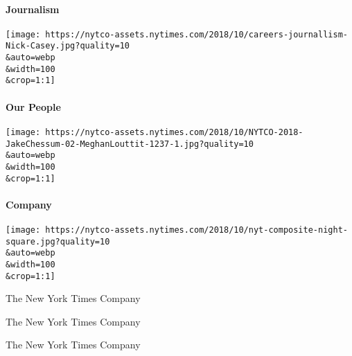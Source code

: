 \href{https://www.nytco.com/journalism/}{}

\hypertarget{journalism}{%
\paragraph{Journalism}\label{journalism}}

\texttt{[image: https://nytco-assets.nytimes.com/2018/10/careers-journallism-Nick-Casey.jpg?quality=10\\\&auto=webp\\\&width=100\\\&crop=1:1]}

\href{https://www.nytco.com/company/people/}{}

\hypertarget{our-people}{%
\paragraph{Our People}\label{our-people}}

\texttt{[image: https://nytco-assets.nytimes.com/2018/10/NYTCO-2018-JakeChessum-02-MeghanLouttit-1237-1.jpg?quality=10\\\&auto=webp\\\&width=100\\\&crop=1:1]}

\href{https://www.nytco.com/company/}{}

\hypertarget{company}{%
\paragraph{Company}\label{company}}

\texttt{[image: https://nytco-assets.nytimes.com/2018/10/nyt-composite-night-square.jpg?quality=10\\\&auto=webp\\\&width=100\\\&crop=1:1]}

The New York Times Company

The New York Times Company

The New York Times Company

